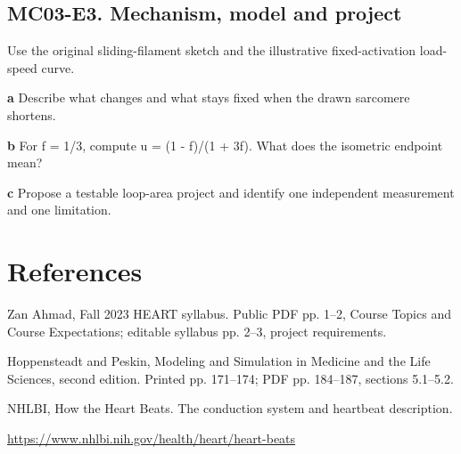 \documentclass[11pt,letterpaper]{article}
\theoremstyle{definition}\newtheorem{definition}{Definition}\newtheorem{example}{Example}
\numberwithin{equation}{section}
\begin{document}
\par\noindent\begin{minipage}{\linewidth}
\subsection*{MC03-E3. Mechanism, model and project}
Use the original sliding-filament sketch and the illustrative fixed-activation load-speed curve.

\textbf{a} Describe what changes and what stays fixed when the drawn sarcomere shortens.

\end{minipage}\par\medskip
\textbf{b} For f =\allowbreak{} 1/3, compute u =\allowbreak{} (1 - f)/(1 +\allowbreak{} 3f). What does the isometric endpoint mean?

\textbf{c} Propose a testable loop-area project and identify one independent measurement and one limitation.

\section*{References}
\noindent\begin{minipage}{\linewidth}
Zan Ahmad, Fall 2023 HEART syllabus. Public PDF pp. 1--2, Course Topics and Course Expectations; editable syllabus pp. 2--3, project requirements.

\end{minipage}\par\medskip
\noindent\begin{minipage}{\linewidth}
Hoppensteadt and Peskin, Modeling and Simulation in Medicine and the Life Sciences, second edition. Printed pp. 171--174; PDF pp. 184--187, sections 5.1--5.2.

\end{minipage}\par\medskip
\noindent\begin{minipage}{\linewidth}
NHLBI, How the Heart Beats. The conduction system and heartbeat description.

\url{https://www.nhlbi.nih.gov/health/heart/heart-beats}
\end{minipage}\par\medskip
\end{document}
